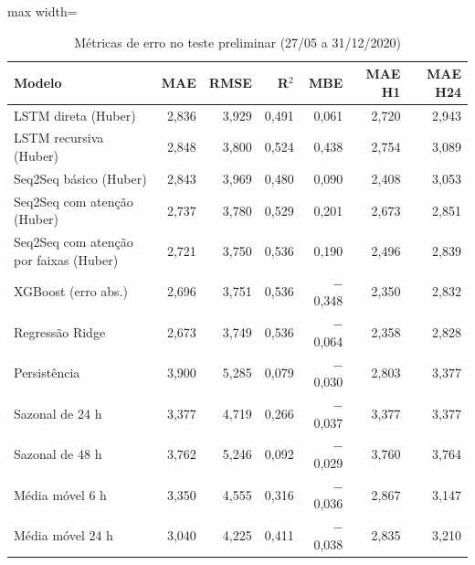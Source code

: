 \begin{table}[!htbp]
    \centering
    \caption{Métricas de erro no teste preliminar (27/05 a 31/12/2020)}
    \label{tab:metricas_teste_historico}
    \small
    \begin{adjustbox}{max width=\textwidth}
    \begin{tabular}{lrrrrrr}
        \toprule
        Modelo & MAE & RMSE & R$^2$ & MBE & MAE H1 & MAE H24 \\
        \midrule
        LSTM direta (Huber) & 2,836 & 3,929 & 0,491 & 0,061 & 2,720 & 2,943 \\
        LSTM recursiva (Huber) & 2,848 & 3,800 & 0,524 & 0,438 & 2,754 & 3,089 \\
        Seq2Seq básico (Huber) & 2,843 & 3,969 & 0,480 & 0,090 & 2,408 & 3,053 \\
        Seq2Seq com atenção (Huber) & 2,737 & 3,780 & 0,529 & 0,201 & 2,673 & 2,851 \\
        Seq2Seq com atenção por faixas (Huber) & 2,721 & 3,750 & 0,536 & 0,190 & 2,496 & 2,839 \\
        XGBoost (erro abs.) & 2,696 & 3,751 & 0,536 & $-$0,348 & 2,350 & 2,832 \\
        Regressão Ridge & 2,673 & 3,749 & 0,536 & $-$0,064 & 2,358 & 2,828 \\
        \midrule
        Persistência & 3,900 & 5,285 & 0,079 & $-$0,030 & 2,803 & 3,377 \\
        Sazonal de 24 h & 3,377 & 4,719 & 0,266 & $-$0,037 & 3,377 & 3,377 \\
        Sazonal de 48 h & 3,762 & 5,246 & 0,092 & $-$0,029 & 3,760 & 3,764 \\
        Média móvel 6 h & 3,350 & 4,555 & 0,316 & $-$0,036 & 2,867 & 3,147 \\
        Média móvel 24 h & 3,040 & 4,225 & 0,411 & $-$0,038 & 2,835 & 3,210 \\
        \bottomrule
    \end{tabular}
    \end{adjustbox}
\end{table}

